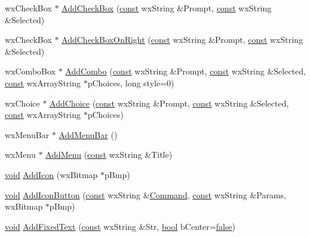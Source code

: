 \begin{DoxyCompactItemize}
\item 
wx\+Check\+Box $\ast$ \hyperlink{class_shuttle_gui_base_a8c68a737f8ab224fefa8b4f452c38073}{Add\+Check\+Box} (\hyperlink{getopt1_8c_a2c212835823e3c54a8ab6d95c652660e}{const} wx\+String \&Prompt, \hyperlink{getopt1_8c_a2c212835823e3c54a8ab6d95c652660e}{const} wx\+String \&Selected)
\item 
wx\+Check\+Box $\ast$ \hyperlink{class_shuttle_gui_base_a96463f4053385f470f717df0ec2fcfc0}{Add\+Check\+Box\+On\+Right} (\hyperlink{getopt1_8c_a2c212835823e3c54a8ab6d95c652660e}{const} wx\+String \&Prompt, \hyperlink{getopt1_8c_a2c212835823e3c54a8ab6d95c652660e}{const} wx\+String \&Selected)
\item 
wx\+Combo\+Box $\ast$ \hyperlink{class_shuttle_gui_base_a702519066dd18b9f01c40275886e5a4c}{Add\+Combo} (\hyperlink{getopt1_8c_a2c212835823e3c54a8ab6d95c652660e}{const} wx\+String \&Prompt, \hyperlink{getopt1_8c_a2c212835823e3c54a8ab6d95c652660e}{const} wx\+String \&Selected, \hyperlink{getopt1_8c_a2c212835823e3c54a8ab6d95c652660e}{const} wx\+Array\+String $\ast$p\+Choices, long style=0)
\item 
wx\+Choice $\ast$ \hyperlink{class_shuttle_gui_base_af7a1f08500177bfe4cb37255043aebc0}{Add\+Choice} (\hyperlink{getopt1_8c_a2c212835823e3c54a8ab6d95c652660e}{const} wx\+String \&Prompt, \hyperlink{getopt1_8c_a2c212835823e3c54a8ab6d95c652660e}{const} wx\+String \&Selected, \hyperlink{getopt1_8c_a2c212835823e3c54a8ab6d95c652660e}{const} wx\+Array\+String $\ast$p\+Choices)
\item 
wx\+Menu\+Bar $\ast$ \hyperlink{class_shuttle_gui_base_abfd4cc8bbd3c040c9c4b81d4392291e1}{Add\+Menu\+Bar} ()
\item 
wx\+Menu $\ast$ \hyperlink{class_shuttle_gui_base_a72449f79016f1666e29b9355f80d98ba}{Add\+Menu} (\hyperlink{getopt1_8c_a2c212835823e3c54a8ab6d95c652660e}{const} wx\+String \&Title)
\item 
\hyperlink{sound_8c_ae35f5844602719cf66324f4de2a658b3}{void} \hyperlink{class_shuttle_gui_base_a8daa526fec2dcc936d0983d31871bc09}{Add\+Icon} (wx\+Bitmap $\ast$p\+Bmp)
\item 
\hyperlink{sound_8c_ae35f5844602719cf66324f4de2a658b3}{void} \hyperlink{class_shuttle_gui_base_a160fd0d33ee7e065efe6e35268242707}{Add\+Icon\+Button} (\hyperlink{getopt1_8c_a2c212835823e3c54a8ab6d95c652660e}{const} wx\+String \&\hyperlink{class_command}{Command}, \hyperlink{getopt1_8c_a2c212835823e3c54a8ab6d95c652660e}{const} wx\+String \&Params, wx\+Bitmap $\ast$p\+Bmp)
\item 
\hyperlink{sound_8c_ae35f5844602719cf66324f4de2a658b3}{void} \hyperlink{class_shuttle_gui_base_a39ab14bc1c316d1bf2d0625189b6991f}{Add\+Fixed\+Text} (\hyperlink{getopt1_8c_a2c212835823e3c54a8ab6d95c652660e}{const} wx\+String \&Str, \hyperlink{mac_2config_2i386_2lib-src_2libsoxr_2soxr-config_8h_abb452686968e48b67397da5f97445f5b}{bool} b\+Center=\hyperlink{mac_2config_2i386_2lib-src_2libsoxr_2soxr-config_8h_a65e9886d74aaee76545e83dd09011727}{false})

\end{DoxyCompactItemize}
